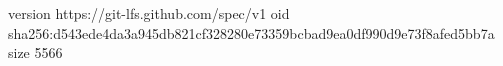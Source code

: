 version https://git-lfs.github.com/spec/v1
oid sha256:d543ede4da3a945db821cf328280e73359bcbad9ea0df990d9e73f8afed5bb7a
size 5566
